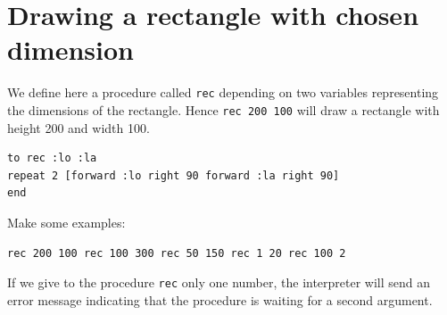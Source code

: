  \section{Drawing a rectangle with chosen dimension}
 \noindent We define here a procedure called \texttt{rec} depending on two variables representing the dimensions of the rectangle. Hence \texttt{rec 200 100} will draw a rectangle with height 200 and width 100.
 \begin{verbatim}
to rec :lo :la
repeat 2 [forward :lo right 90 forward :la right 90]
end
\end{verbatim} 
Make some examples: 
\begin{verbatim}
rec 200 100 rec 100 300 rec 50 150 rec 1 20 rec 100 2 
\end{verbatim}
If we give to the procedure \texttt{rec} only one number, the interpreter will send an error message indicating that the procedure is waiting for a second argument.
